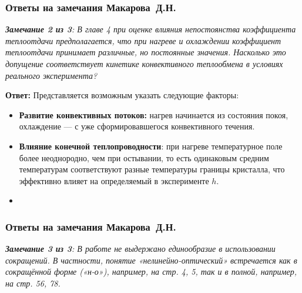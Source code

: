 \begin{frame}
	\frametitle{Ответы на замечания Макарова~Д.Н.}
	\small{\textit{\textbf{Замечание 2 из 3}: В главе 4 при оценке влияния непостоянства коэффициента теплоотдачи предполагается, что при нагреве и охлаждении коэффициент теплоотдачи принимает различные, но постоянные значения. Насколько это допущение соответствует кинетике конвективного теплообмена в условиях реального эксперимента?}}
	
	\hfill
	
	\textbf{Ответ:} Представляется возможным указать следующие факторы:
	
	\begin{itemize}
		\item \textbf{Развитие конвективных потоков:} нагрев начинается из состояния покоя,  охлаждение — с уже сформировавшегося конвективного течения.
		\item \textbf{Влияние конечной теплопроводности}: при нагреве температурное поле более неоднородно, чем при остывании, то есть одинаковым средним температурам соответствуют разные температуры границы кристалла, что эффективно влияет на определяемый в эксперименте $h$.
		\item {}
	\end{itemize}
	
	
	
\end{frame}


\begin{frame}
	\frametitle{Ответы на замечания Макарова~Д.Н.}
	\small{\textit{\textbf{Замечание 3 из 3}: В работе не выдержано единообразие в использовании сокращений. В частности, понятие «нелинейно-оптический» встречается как в сокращённой форме («н-о»), например, на стр. 4, 5, так и в полной, например, на стр. 56, 78.}}
	
	\hfill

	
	
\end{frame}